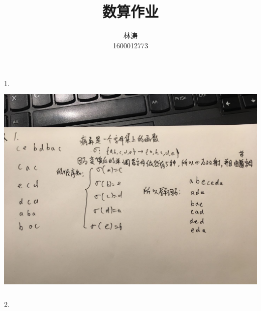\documentclass[UTF8]{ctexart}
\title{数算作业}
\author{林涛\\1600012773}
\begin{document}
\maketitle

1.
\includegraphics[height=300pt]{1.jpg}

2.
\end{document}

